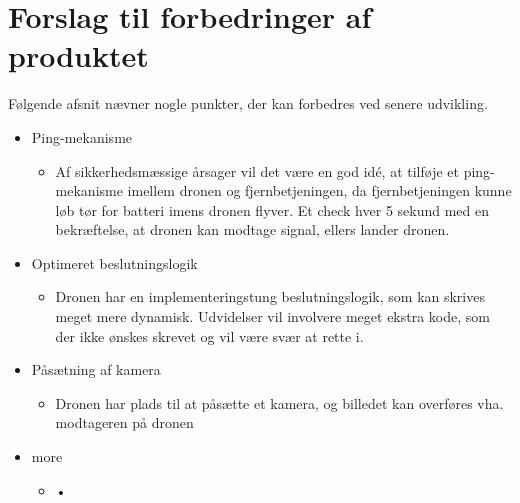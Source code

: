 \documentclass[Main]{subfiles}
\begin{document}
\section{Forslag til forbedringer af produktet}

Følgende afsnit nævner nogle punkter, der kan forbedres ved senere udvikling.

\begin{itemize}
\item Ping-mekanisme
\vspace{-10pt}
	\begin{itemize}
	\item Af sikkerhedsmæssige årsager vil det være en god idé, at tilføje et ping-mekanisme imellem dronen og fjernbetjeningen, da fjernbetjeningen kunne løb tør for batteri imens dronen flyver. 
	Et check hver 5 sekund med en bekræftelse, at dronen kan modtage signal, ellers lander dronen.
	\end{itemize}

\item Optimeret beslutningslogik
\vspace{-10pt}
	\begin{itemize}
	\item Dronen har en implementeringstung beslutningslogik, som kan skrives meget mere dynamisk. Udvidelser vil involvere meget ekstra kode, som der ikke ønskes skrevet og vil være svær at rette i.
	\end{itemize}
	
\item Påsætning af kamera
\vspace{-10pt}
	\begin{itemize}
	\item Dronen har plads til at påsætte et kamera, og billedet kan overføres vha. modtageren på dronen
	\end{itemize}

\item more
\vspace{-10pt}
	\begin{itemize}
	\item •
	\end{itemize}

\end{itemize}
\end{document}
